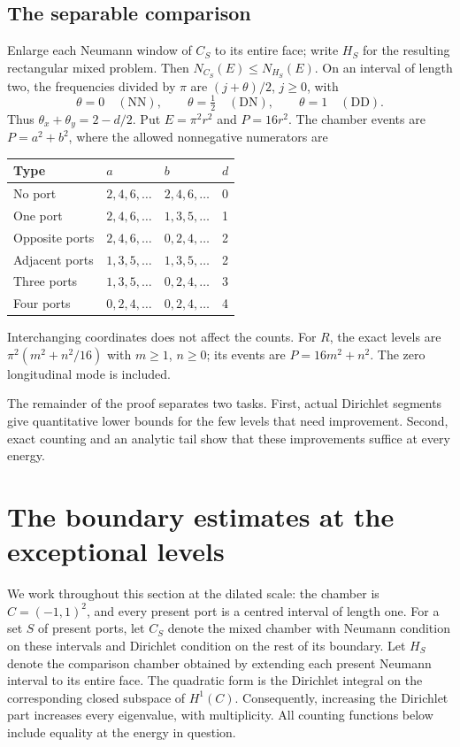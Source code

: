 \documentclass[11pt,reqno]{amsart}
\numberwithin{equation}{section}
\begin{document}
\subsection{The separable comparison}

Enlarge each Neumann window of $C_S$ to its entire face;
write $H_S$ for the resulting rectangular mixed problem.
Then $N_{C_S}(E)\le N_{H_S}(E)$. On an interval of length
two, the frequencies divided by $\pi$ are $(j+\theta)/2$,
$j\ge0$, with
\[
 \theta=0\quad(\mathrm{NN}),\qquad
 \theta=\tfrac12\quad(\mathrm{DN}),\qquad
 \theta=1\quad(\mathrm{DD}).
\]
Thus $\theta_x+\theta_y=2-d/2$. Put $E=\pi^2r^2$ and
$P=16r^2$. The chamber events are $P=a^2+b^2$, where the
allowed nonnegative numerators are
\begin{center}
\begin{tabular}{@{}llll@{}}
\toprule
Type&$a$&$b$&$d$\\\midrule
No port&$2,4,6,\ldots$&$2,4,6,\ldots$&0\\
One port&$2,4,6,\ldots$&$1,3,5,\ldots$&1\\
Opposite ports&$2,4,6,\ldots$&$0,2,4,\ldots$&2\\
Adjacent ports&$1,3,5,\ldots$&$1,3,5,\ldots$&2\\
Three ports&$1,3,5,\ldots$&$0,2,4,\ldots$&3\\
Four ports&$0,2,4,\ldots$&$0,2,4,\ldots$&4\\
\bottomrule
\end{tabular}
\end{center}
Interchanging coordinates does not affect the counts.
For $R$, the exact levels are
$\pi^2(m^2+n^2/16)$ with $m\ge1$, $n\ge0$; its events
are $P=16m^2+n^2$. The zero longitudinal mode is included.

The remainder of the proof separates two tasks. First,
actual Dirichlet segments give quantitative lower bounds
for the few levels that need improvement. Second, exact
counting and an analytic tail show that these improvements
suffice at every energy.

\section{The boundary estimates at the exceptional levels}
\label{bd:section}

We work throughout this section at the dilated scale: the chamber is
$C=(-1,1)^2$, and every present port is a centred interval of length one.
For a set $S$ of present ports, let $C_S$ denote the mixed chamber with
Neumann condition on these intervals and Dirichlet condition on the rest
of its boundary. Let $H_S$ denote the comparison chamber obtained by
extending each present Neumann interval to its entire face. The quadratic
form is the Dirichlet integral on the corresponding closed subspace of
$H^1(C)$. Consequently, increasing the Dirichlet part increases every
eigenvalue, with multiplicity. All counting functions below include
equality at the energy in question.
\end{document}
